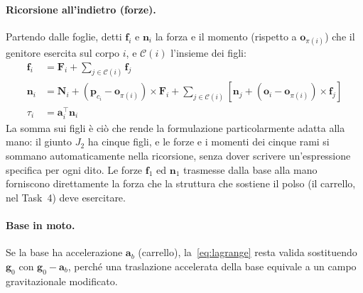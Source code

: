 \paragraph{Ricorsione all'indietro (forze).} Partendo dalle foglie, detti $\boldsymbol f_i$ e $\boldsymbol n_i$ la forza e il momento (rispetto a $\boldsymbol o_{\pi(i)}$) che il genitore esercita sul corpo $i$, e $\mathcal C(i)$ l'insieme dei figli:
\begin{align}
    \boldsymbol f_i&=\boldsymbol F_i+\sum_{j\in\mathcal C(i)}\boldsymbol f_j\\
    \boldsymbol n_i&=\boldsymbol N_i+(\boldsymbol p_{c_i}-\boldsymbol o_{\pi(i)})\times\boldsymbol F_i+\sum_{j\in\mathcal C(i)}\left[\boldsymbol n_j+(\boldsymbol o_i-\boldsymbol o_{\pi(i)})\times\boldsymbol f_j\right]\\
    \tau_i&=\boldsymbol a_i^\top\boldsymbol n_i
\end{align}
La somma sui figli è ciò che rende la formulazione particolarmente adatta alla mano: il giunto $J_2$ ha cinque figli, e le forze e i momenti dei cinque rami si sommano automaticamente nella ricorsione, senza dover scrivere un'espressione specifica per ogni dito. Le forze $\boldsymbol f_1$ ed $\boldsymbol n_1$ trasmesse dalla base alla mano forniscono direttamente la forza che la struttura che sostiene il polso (il carrello, nel Task~4) deve esercitare.

\paragraph{Base in moto.} Se la base ha accelerazione $\boldsymbol a_b$ (carrello), la~\eqref{eq:lagrange} resta valida sostituendo $\boldsymbol g_0$ con $\boldsymbol g_0-\boldsymbol a_b$, perché una traslazione accelerata della base equivale a un campo gravitazionale modificato.

